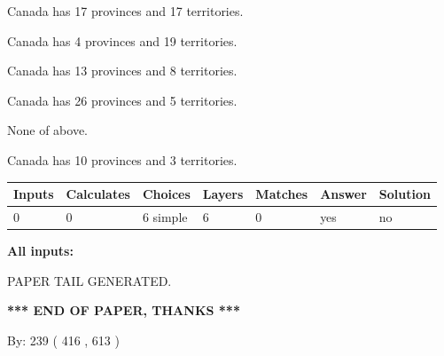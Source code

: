 \documentclass[12pt]{article}
\begin{document}
 
Canada has  17 provinces and  17 territories.
 
 
Canada has   4 provinces and  19 territories.
 
 
Canada has  13 provinces and  8 territories.
 
 
Canada has  26 provinces and  5 territories.
 
 
 None of above.
 
 
\noindent{}
 
 
Canada has 10  provinces and 3 territories.
 
 
\noindent{}
 
 
   
   
   
   
\noindent\begin{tabular}{|l|l|l|l|l|l|l|}
 \hline
Inputs & Calculates & Choices & Layers & Matches & Answer & Solution \\ \hline
 0  & 
 0  & 
 6
  simple  
  & 
 6  & 
 0  & 
  yes & 
  no 
  \\ \hline
 \end{tabular}
   
   
   
   
\noindent{}
   
   
   
   
\noindent\vspace{0.1in}\hspace{-0.08in} {\textbf{\Large{All inputs: }}}
   
   
   
   
   
   
 \vspace{0.2in}
 
   
   
\vspace{2.0in} PAPER TAIL GENERATED.
   
   
   
   
\vspace{1.0in} 
{\textbf{\large{ *** END OF PAPER, THANKS *** }}} 
   
   
\hspace{1.0in} By: 
 239 ( 416 ,  613 )
   
\end{document}
